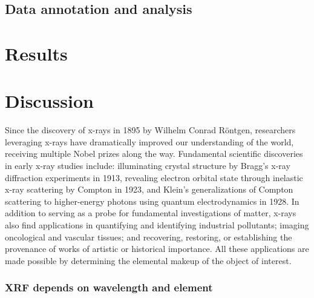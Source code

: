 \documentclass[%
  aip,12pt,tightenlines,
  amsthm,
 amsmath,amssymb,
 reprint,%
]{revtex4-1}
\newcommand{\fLabel}[1]{\label{figure:#1}}
\newcommand{\sLabel}[1]{\label{section:#1}}
\newcommand{\pcaption}[1]{\caption{\noindent#1}}
\newcommand{\firstp}[0]{\noindent}
\newcommand{\pl}[0]{\vspace{6pt}}
\newcommand{\pEndF}[0]{ \\ }
\newcommand{\pStartF}[0]{ }
\begin{document}
\subsection{\sLabel{Surface}Data annotation and analysis}

\section{\sLabel{Results}Results}

\section{\sLabel{Discussion}Discussion}


\firstp Since the discovery of x-rays in 1895 by Wilhelm Conrad R{\"o}ntgen, researchers leveraging x-rays have dramatically improved our understanding of the world, receiving multiple Nobel prizes along the way.\cite{santra_concepts_2009} Fundamental scientific discoveries in early x-ray studies include: illuminating crystal structure by Bragg's x-ray diffraction experiments in 1913,\cite{bragg_reflection_1913} revealing electron orbital state through inelastic x-ray scattering by Compton in 1923,\cite{compton_spectrum_1923} and Klein's generalizations of Compton scattering to higher-energy photons using quantum electrodynamics in 1928.\cite{klein_scattering_1928} In addition to serving as a probe for fundamental investigations of matter, x-rays also find applications in quantifying and identifying industrial pollutants;\cite{luo_determination_2012} imaging oncological and vascular tissues;\cite{butler_bio-medical_2008} and recovering, restoring, or establishing the provenance of works of artistic \cite{janssens_photon-based_2010} or historical \cite{bergmann_archimedes_2007} importance. All these applications are made possible by determining the elemental makeup of the object of interest. \pl


\subsubsection{\sLabel{Beer}XRF depends on wavelength and element}
\end{document}
